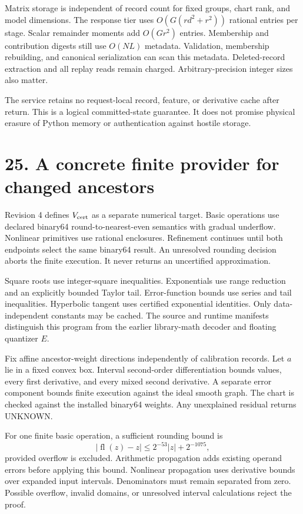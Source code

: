  Matrix storage is independent of record count for fixed groups, chart rank, and model dimensions. The response tier uses $O(G(rd^2+r^2))$ rational entries per stage. Scalar remainder moments add $O(Gr^2)$ entries. Membership and contribution digests still use $O(NL)$ metadata. Validation, membership rebuilding, and canonical serialization can scan this metadata. Deleted-record extraction and all replay reads remain charged. Arbitrary-precision integer sizes also matter.

The service retains no request-local record, feature, or derivative cache after return. This is a logical committed-state guarantee. It does not promise physical erasure of Python memory or authentication against hostile storage.

\newpage
\section*{25. A concrete finite provider for changed ancestors}
Revision 4 defines $V_{\rm cert}$ as a separate numerical target. Basic operations use declared binary64 round-to-nearest-even semantics with gradual underflow. Nonlinear primitives use rational enclosures. Refinement continues until both endpoints select the same binary64 result. An unresolved rounding decision aborts the finite execution. It never returns an uncertified approximation.

Square roots use integer-square inequalities. Exponentials use range reduction and an explicitly bounded Taylor tail. Error-function bounds use series and tail inequalities. Hyperbolic tangent uses certified exponential identities. Only data-independent constants may be cached. The source and runtime manifests distinguish this program from the earlier library-math decoder and floating quantizer $E$.

 Fix affine ancestor-weight directions independently of calibration records. Let $a$ lie in a fixed convex box. Interval second-order differentiation bounds values, every first derivative, and every mixed second derivative. A separate error component bounds finite execution against the ideal smooth graph. The chart is checked against the installed binary64 weights. Any unexplained residual returns UNKNOWN.

For one finite basic operation, a sufficient rounding bound is
\[
 |\operatorname{fl}(z)-z|\leq 2^{-53}|z|+2^{-1075},
\]
provided overflow is excluded. Arithmetic propagation adds existing operand errors before applying this bound. Nonlinear propagation uses derivative bounds over expanded input intervals. Denominators must remain separated from zero. Possible overflow, invalid domains, or unresolved interval calculations reject the proof.

